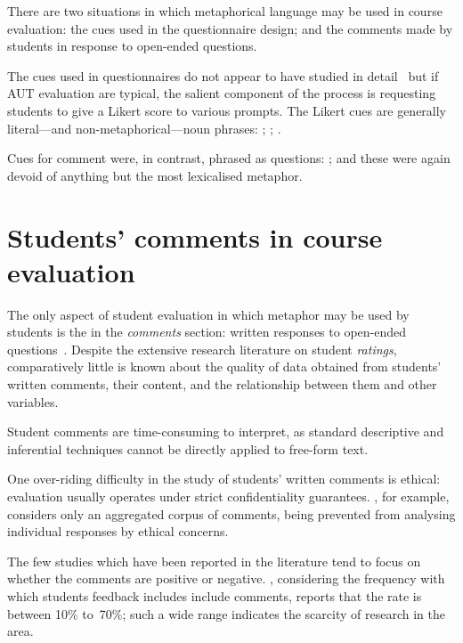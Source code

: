 There are two situations in which metaphorical language may be used in
course evaluation: the cues used in the questionnaire design; and the
comments made by students in response to open-ended questions.

The cues used in questionnaires do not appear to have studied in
detail~\citep{aleamoni1980} but if AUT evaluation are typical, the
salient component of the process is requesting students to give a
Likert score to various prompts.  The Likert cues are generally
literal---and non-metaphorical---noun phrases: ; ; .

Cues for comment were, in contrast, phrased as questions: ;  and these were again devoid
of anything but the most lexicalised metaphor.

\section{Students' comments in course evaluation}

The only aspect of student evaluation in which metaphor may be used by
students is the in the \emph{comments} section: written responses to
open-ended questions~\citep{stewart2015}.  Despite the extensive
research literature on student \emph{ratings}, comparatively little is
known about the quality of data obtained from students' written
comments, their content, and the relationship between them and other
variables.

Student comments are time-consuming to interpret, as standard
descriptive and inferential techniques cannot be directly applied to
free-form text.

One over-riding difficulty in the study of students' written comments
is ethical: evaluation usually operates under strict confidentiality
guarantees.  , for example, considers only an
aggregated corpus of comments, being prevented from analysing
individual responses by ethical concerns.

The few studies which have been reported in the literature tend to
focus on whether the comments are positive or negative.
, considering the frequency with which students
feedback includes include comments, reports that the rate is between
10\% to~70\%; such a wide range indicates the scarcity of research in
the area.

